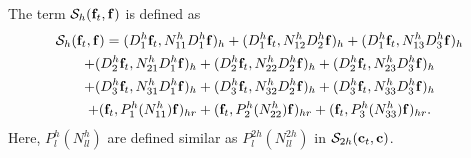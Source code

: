 The term $\mathcal{S}_{h}({\bf f}_t,{\bf f})$ is defined as
\begin{multline*}
\mathcal{S}_{h}({\bf f}_t,{\bf f}) = ({D}_1^{h}{\bf f}_t,{N}_{11}^{h}{D}_1^h{\bf f})_{h} +  ({D}_1^{h}{\bf f}_t,{N}_{12}^{h}{D}_2^h{\bf f})_{h} +  ({D}_1^{h}{\bf f}_t,{N}_{13}^{h}{D}_3^h{\bf f})_{h}\\
+  ({D}_2^{h}{\bf f}_t,{N}_{21}^{h}{D}_1^h{\bf f})_{h} 
+  ({D}_2^{h}{\bf f}_t,{N}_{22}^{h}{D}_2^h{\bf f})_{h} +  ({D}_2^{h}{\bf f}_t,{N}_{23}^{h}{D}_3^h{\bf f})_{h} \\
+  ({D}_3^{h}{\bf f}_t,{N}_{31}^{h}{D}_1^h{\bf f})_{h} 
+  ({D}_3^{h}{\bf f}_t,{N}_{32}^{h}{D}_2^h{\bf f})_{h} +  ({D}_3^{h}{\bf f}_t,{N}_{33}^{h}{D}_3^h{\bf f})_{h}\\
+ ({\bf f}_t, P^{h}_1(N_{11}^h){\bf f})_{hr} + ({\bf f}_t, P^{h}_2(N_{22}^h){\bf f})_{hr} + ({\bf f}_t, P^{h}_3(N_{33}^h){\bf f})_{hr}.
\end{multline*}
Here, $P_l^h(N_{ll}^h)$ are defined similar as $P_l^{2h}(N_{ll}^{2h})$ in $\mathcal{S}_{2h}({\bf c}_t,{\bf c})$. 
